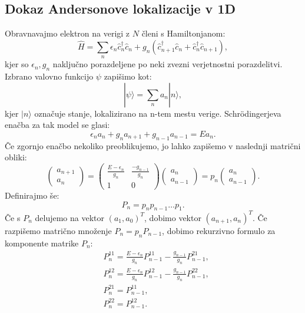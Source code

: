 \cleardoublepage
\renewcommand\appendixname{Dodatek}
\begin{appendices}
\chapter{Dokaz Andersonove lokalizacije v 1D}
Obravnavajmo elektron na verigi z $N$ členi s Hamiltonjanom:
\begin{equation}
\hat{H} = \sum_n \epsilon_n \hat{c}^\dagger_n \hat{c}_n + g_n \left( \hat{c}^\dagger_{n+1} \hat{c}_n + \hat{c}^\dagger_n \hat{c}_{n+1} \right),
\end{equation}
kjer so $\epsilon_n , g_n$ naključno porazdeljene po neki zvezni verjetnostni porazdelitvi.
Izbrano valovno funkcijo $\psi$ zapišimo kot:
\begin{equation}
| \psi \rangle = \sum_n a_n |n \rangle,
\end{equation}
kjer $| n \rangle$ označuje stanje, lokalizirano na n-tem mestu verige.
Schrödingerjeva enačba za tak model se glasi:
\begin{equation}
\epsilon_n a_n + g_{n} a_{n+1} + g_{n-1} a_{n-1} = E a_n.
\end{equation} 
Če zgornjo enačbo nekoliko preoblikujemo, jo lahko zapišemo v naslednji matrični obliki:
\begin{equation}
\begin{pmatrix}
a_{n+1} \\ a_n 
\end{pmatrix}
=
\begin{pmatrix}
\frac{E-\epsilon_n}{g_{n}} & \frac{-g_{n-1}}{g_{n}} \\ 1 & 0 
\end{pmatrix}
\begin{pmatrix}
a_{n} \\ a_{n-1} 
\end{pmatrix}
= p_n 
\begin{pmatrix}
a_{n} \\ a_{n-1} 
\end{pmatrix}.
\end{equation}
Definirajmo še:
\begin{equation} \label{spomnimo5}
P_n = p_n  p_{n-1}  \dots  p_1.
\end{equation}
Če s $P_n$ delujemo na vektor $(a_1, a_0)^T$, dobimo vektor $(a_{n+1}, a_{n})^T$.
Če razpišemo matrično množenje $P_n = p_n P_{n-1}$, dobimo rekurzivno formulo za komponente matrike $P_n$:
\begin{align}
&P_n^{11} = \frac{E-\epsilon_n}{g_{n}} P_{n-1}^{11} - \frac{g_{n-1}}{g_{n}} P_{n-1}^{21}, \\
&P_n^{12} = \frac{E-\epsilon_n}{g_{n}} P_{n-1}^{12} - \frac{g_{n-1}}{g_{n}} P_{n-1}^{22}, \\
&P_n^{21} = P_{n-1}^{11}, \\
&P_n^{22} = P_{n-1}^{12}.
\end{align}


\end{appendices}
